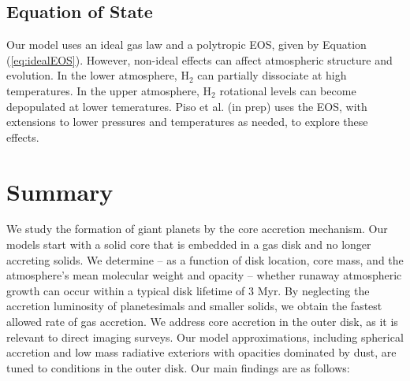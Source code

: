 \documentclass[apj, numberedappendix]{emulateapj}
\newcommand{\Eq}[1]{Equation\,(\ref{#1})}
\begin{document}
\subsection{Equation of State}
\label{sec:EOS}
 
Our model uses an ideal gas law and a polytropic EOS, given by \Eq{eq:idealEOS}.  However, non-ideal effects can affect atmospheric structure and evolution.  In the lower atmosphere, H$_2$ can partially dissociate at high temperatures.  In the upper atmosphere, H$_2$ rotational levels can become depopulated at lower temeratures.   Piso et al. (in prep) uses the \citet{saumon95} EOS, with extensions to lower pressures and temperatures as needed, to explore these effects.


\section{Summary} \label{sec:conclusions}

We study the formation of giant planets by the core accretion mechanism.  Our models start with a solid core that is embedded in a gas disk and no longer accreting solids.  We determine -- as a function of disk location, core mass, and the atmosphere's mean molecular weight and opacity -- whether runaway atmospheric growth can occur within a typical disk lifetime of 3 Myr.  By neglecting the accretion luminosity of planetesimals and smaller solids, we obtain the fastest allowed rate of gas accretion.  We address core accretion in the outer disk, as it is relevant to direct imaging surveys.  Our model approximations, including spherical accretion and low mass radiative exteriors with opacities dominated by dust, are tuned to conditions in the outer disk.   Our main findings are as follows:
\end{document}
